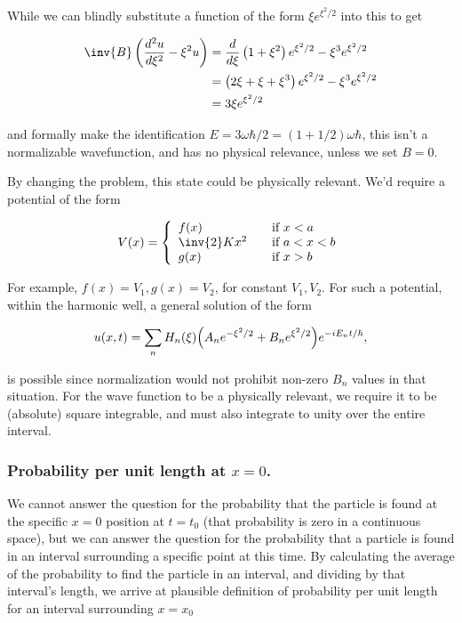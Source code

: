 While we can blindly substitute a function of the form $\xi e^{\xi^2/2}$ into this to get

\begin{align*}
\inv{B} \left(\frac{d^2 u}{d\xi^2} - \xi^2 u\right)
&=
\frac{d}{d\xi} \left( 1 + \xi^2 \right) e^{\xi^2/2} - \xi^3 e^{\xi^2/2} \\
&=
\left( 2 \xi + \xi + \xi^3 \right) e^{\xi^2/2} - \xi^3 e^{\xi^2/2} \\
&=
3 \xi e^{\xi^2/2}
\end{align*}

and formally make the identification $E = 3 \omega \hbar/2 = (1 + 1/2) \omega \hbar$, this isn't a normalizable wavefunction, and has no physical relevance, unless we set $B = 0$.

By changing the problem, this state could be physically relevant.  We'd require a potential of the form

\begin{equation}\label{eqn:qmIproblemSet5:11}
V(x) =
\left\{
\begin{array}{l l}
f(x) & \quad \mbox{if $x < a$} \\
\inv{2} K x^2 & \quad \mbox{if $a < x < b$} \\
g(x) & \quad \mbox{if $x > b$} \\
\end{array}
\right.
\end{equation}

For example, $f(x) = V_1, g(x) = V_2$, for constant $V_1, V_2$.  For such a potential, within the harmonic well, a general solution of the form

\begin{equation}\label{eqn:qmIproblemSet5:19}
u(x,t) = \sum_n H_n(\xi) \Bigl(A_n e^{-\xi^2/2} + B_n e^{\xi^2/2} \Bigr) e^{-i E_n t/\hbar},
\end{equation}

is possible since normalization would not prohibit non-zero $B_n$ values in that situation.  For the wave function to be a physically relevant, we require it to be (absolute) square integrable, and must also integrate to unity over the entire interval.

\subsubsection{Probability per unit length at $x=0$.}

We cannot answer the question for the probability that the particle is found at the specific $x=0$ position at $t=t_0$ (that probability is zero in a continuous space), but we can answer the question for the probability that a particle is found in an interval surrounding a specific point at this time.  By calculating the average of the probability to find the particle in an interval, and dividing by that interval's length, we arrive at plausible definition of probability per unit length for an interval surrounding $x = x_0$

